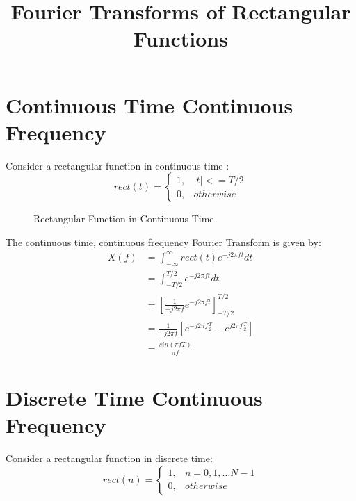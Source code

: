 \documentclass{article}
\begin{document}
\title{Fourier Transforms of Rectangular Functions}
\maketitle

\section{Continuous Time Continuous Frequency}

Consider a rectangular function in continuous time \cite{wikipedia_rect}:
\begin{equation}
rect(t)= 
	\begin{cases}
      1, & |t| <= T/2 \\
      0, & otherwise
	\end{cases}
\end{equation}

\begin{figure}[h]
\caption{Rectangular Function in Continuous Time}
\vspace{5mm}
\label{fig:rect_time}
\centering
{}
\end{figure}

The continuous time, continuous frequency Fourier Transform is given by:
\begin{equation} \label{eq:ctcf}
\begin{split}
X(f) &= \int_{-\infty}^{\infty} rect(t)e^{-j2 \pi ft} dt\\
     &= \int_{-T/2}^{T/2} e^{-j 2 \pi ft} dt \\
     &= \left[ \frac{1}{-j 2 \pi f} e^{-j 2 \pi ft} \right]_{-T/2}^{T/2} \\
     &= \frac{1}{-j 2 \pi f} \left[  e^{-j 2 \pi f \frac{T}{2}} - e^{j 2 \pi f \frac{T}{2}} \right] \\
     &= \frac{sin(\pi f T)}{\pi f}
\end{split}
\end{equation}

\section{Discrete Time Continuous Frequency}

Consider a rectangular function in discrete time:
\begin{equation}
rect(n)= 
	\begin{cases}
      1, & n=0,1, \ldots N-1 \\
      0, & otherwise
	\end{cases}
\end{equation}
\end{document}
